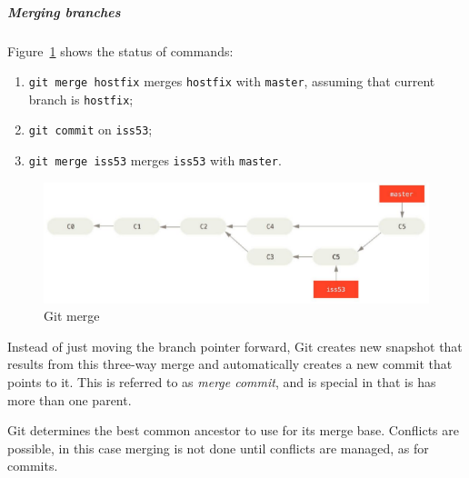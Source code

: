 \subparagraph{Merging branches}
Figure~\ref{img:git_branches_merges} shows the status of commands:
\begin{enumerate}
\item \texttt{git merge hostfix} merges \texttt{hostfix} with \texttt{master}, assuming that current branch is \texttt{hostfix};
\item \texttt{git commit} on \texttt{iss53};
\item \texttt{git merge iss53} merges \texttt{iss53} with \texttt{master}.
\end{enumerate}
\begin{figure}[hbtp]

\centering
\includegraphics[scale=0.4]{images/git_branches_merges.png}
\caption{Git merge}
\label{img:git_branches_merges}
\end{figure}

Instead of just moving the branch pointer forward, Git creates new snapshot that results from this three-way merge and automatically creates a new commit that points to it. This is referred to as \emph{merge commit}, and is special in that is has more than one parent.

Git determines the best common ancestor to use for its merge base. Conflicts are possible, in this case merging is not done until conflicts are managed, as for commits.